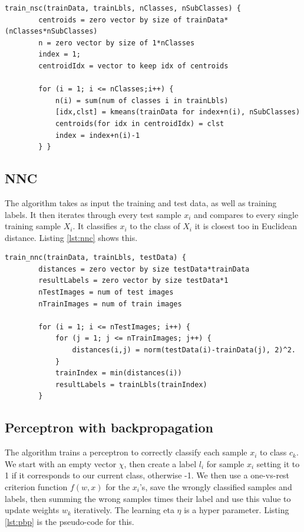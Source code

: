 \documentclass[journal]{IEEEtran}
\begin{document}
\begin{lstlisting}[caption=Implementation of NSC., label={lst:nsc}]
	train_nsc(trainData, trainLbls, nClasses, nSubClasses) {
		centroids = zero vector by size of trainData*(nClasses*nSubClasses)
		n = zero vector by size of 1*nClasses
		index = 1;
		centroidIdx = vector to keep idx of centroids
	
		for (i = 1; i <= nClasses;i++) {
			n(i) = sum(num of classes i in trainLbls)
			[idx,clst] = kmeans(trainData for index+n(i), nSubClasses)
			centroids(for idx in centroidIdx) = clst
			index = index+n(i)-1
		} }
\end{lstlisting}

\subsection{NNC}

The algorithm takes as input the training and test data, as well as training labels. It then iterates through every test sample $x_i$ and compares to every single training sample $X_{i}$. It classifies $x_i$ to the class of $X_{i}$ it is closest too in Euclidean distance. Listing \ref{lst:nnc} shows this.

\begin{minipage}[H]{0.95\linewidth}
	\begin{lstlisting}[caption=Implementation of NNC., label={lst:nnc}]
	train_nnc(trainData, trainLbls, testData) {
		distances = zero vector by size testData*trainData
		resultLabels = zero vector by size testData*1
		nTestImages = num of test images
		nTrainImages = num of train images
		
		for (i = 1; i <= nTestImages; i++) {
			for (j = 1; j <= nTrainImages; j++) {
				distances(i,j) = norm(testData(i)-trainData(j), 2)^2.
			}			
			trainIndex = min(distances(i))
			resultLabels = trainLbls(trainIndex)
		}
	\end{lstlisting}
\end{minipage}

\subsection{Perceptron with backpropagation} 

The algorithm trains a perceptron to correctly classify each sample $x_{i}$ to class $c_{k}$. We start with an empty vector $\chi$, then create a label $l_{i}$ for sample $x_{i}$ setting it to 1 if it corresponds to our current class, otherwise -1. We then use a one-vs-rest criterion function $f(w,x)$ for the $x_{i}$'s, save the wrongly classified samples and labels, then summing the wrong samples times their label and use this value to update weights $w_{k}$ iteratively. The learning eta $\eta$ is a hyper parameter. Listing \ref{lst:pbp} is the pseudo-code for this.
\end{document}
